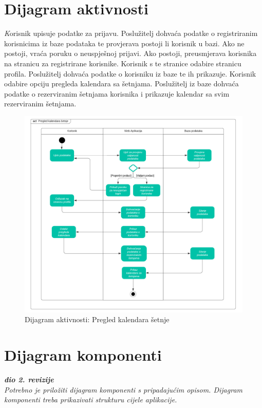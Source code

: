 		\section{Dijagram aktivnosti}
			 \textit
			Korisnik upisuje podatke za prijavu. Poslužitelj dohvaća podatke o registriranim korisnicima iz baze podataka te provjerava postoji li korisnik u bazi. Ako ne postoji, vraća poruku o neuspješnoj prijavi. Ako postoji, preusmjerava korisnika na stranicu za registrirane korisnike. Korisnik s te stranice odabire stranicu profila. Poslužitelj dohvaća podatke o korisniku iz baze te ih prikazuje. Korisnik odabire opciju pregleda kalendara sa šetnjama. Poslužitelj iz baze dohvaća podatke o rezerviranim šetnjama korisnika i prikazuje kalendar sa svim rezerviranim šetnjama.
			\newpage
			\begin{figure}[H]
				\includegraphics[width=1\textwidth]{dijagrami/act.png} %
				\caption{Dijagram aktivnosti: Pregled kalendara šetnje}
				\label{fig:Act1} %
			\end{figure}
		
			\newpage
			\eject
		\section{Dijagram komponenti}
		
			\textbf{\textit{dio 2. revizije}}\\
		
			 \textit{Potrebno je priložiti dijagram komponenti s pripadajućim opisom. Dijagram komponenti treba prikazivati strukturu cijele aplikacije.}